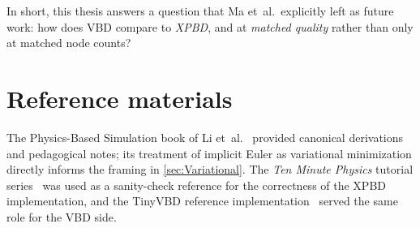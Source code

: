 In short, this thesis answers a question that Ma et~al.\ explicitly left as future
work: how does VBD compare to \emph{XPBD}, and at \emph{matched quality} rather
than only at matched node counts?

\section{Reference materials}
\label{sec:RefMaterials}
The Physics-Based Simulation book of Li et~al.~\cite{li2026physics} provided
canonical derivations and pedagogical notes; its treatment of implicit Euler as
variational minimization directly informs the framing in \autoref{sec:Variational}.
The \emph{Ten Minute Physics} tutorial series~\cite{tenMinutePhysics} was used as
a sanity-check reference for the correctness of the XPBD implementation, and the
TinyVBD reference implementation~\cite{vbdGithub} served the same role for the
VBD side.
